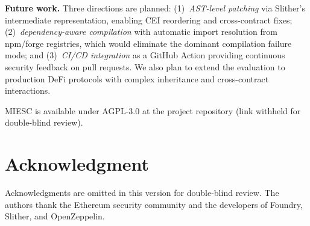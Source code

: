 \documentclass[conference]{IEEEtran}
\begin{document}
\textbf{Future work.} Three directions are planned: (1)~\emph{AST-level patching} via Slither's intermediate representation, enabling CEI reordering and cross-contract fixes; (2)~\emph{dependency-aware compilation} with automatic import resolution from npm/forge registries, which would eliminate the dominant compilation failure mode; and (3)~\emph{CI/CD integration} as a GitHub Action providing continuous security feedback on pull requests. We also plan to extend the evaluation to production DeFi protocols with complex inheritance and cross-contract interactions.

MIESC is available under AGPL-3.0 at the project repository (link withheld for double-blind review).

\section*{Acknowledgment}

Acknowledgments are omitted in this version for double-blind review. The authors thank the Ethereum security community and the developers of Foundry, Slither, and OpenZeppelin.
\end{document}
